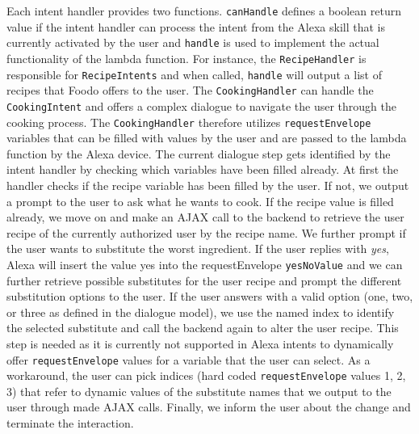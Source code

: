 Each intent handler provides two functions. \texttt{canHandle} defines a boolean return value if the intent handler can process the intent from the Alexa skill that is currently activated by the user and \texttt{handle} is used to implement the actual functionality of the lambda function. For instance, the \texttt{RecipeHandler} is responsible for \texttt{RecipeIntents} and when called, \texttt{handle} will output a list of recipes that Foodo offers to the user. The \texttt{CookingHandler} can handle the \texttt{CookingIntent} and offers a complex dialogue to navigate the user through the cooking process. The \texttt{CookingHandler} therefore utilizes \texttt{requestEnvelope} variables that can be filled with values by the user and are passed to the lambda function by the Alexa device. The current dialogue step gets identified by the intent handler by checking which variables have been filled already. At first the handler checks if the recipe variable has been filled by the user. If not, we output a prompt to the user to ask what he wants to cook. If the recipe value is filled already, we move on and make an AJAX call to the backend to retrieve the user recipe of the currently authorized user by the recipe name. We further prompt if the user wants to substitute the worst ingredient. If the user replies with \textit{yes}, Alexa will insert the value yes into the requestEnvelope \texttt{yesNoValue} and we can further retrieve possible substitutes for the user recipe and prompt the different substitution options to the user. If the user answers with a valid option (one, two, or three as defined in the dialogue model), we use the named index to identify the selected substitute and call the backend again to alter the user recipe. This step is needed as it is currently not supported in Alexa intents to dynamically offer \texttt{requestEnvelope} values for a variable that the user can select. As a workaround, the user can pick indices (hard coded \texttt{requestEnvelope} values 1, 2, 3) that refer to dynamic values of the substitute names that we output to the user through made AJAX calls. Finally, we inform the user about the change and terminate the interaction. 

